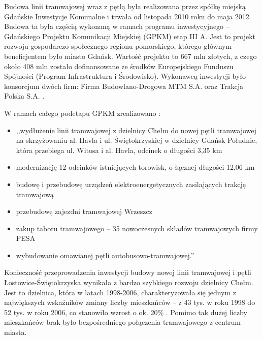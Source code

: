 \documentclass[twoside,12pt]{article}
\begin{document}
	Budowa linii tramwajowej wraz z pętlą była realizowana przez spółkę miejską Gdańskie Inwestycje Komunalne i trwała od listopada 2010 roku do maja 2012. Budowa ta była częścią wykonaną w ramach programu inwestycyjnego -- Gdańskiego Projektu Komunikacji Miejskiej (GPKM) etap III A. Jest to projekt rozwoju gospodarczo-społecznego regionu pomorskiego, którego głównym beneficjentem było miasto Gdańsk. Wartość projektu to 667 mln złotych, z czego około 408 mln zostało dofinansowane ze środków Europejskiego Funduszu Spójności (Program Infrastruktura i Środowisko). Wykonawcą inwestycji było konsorcjum dwóch firm: Firma Budowlano-Drogowa MTM S.A. oraz Trakcja Polska S.A. \cite{portal_gdansk}. 
	
	\begin{samepage}
	W ramach całego podetapu GPKM zrealizowano \cite{portal_gdansk}:
	\begin{itemize}\setlength{\itemsep}{0em}
	\item ,,wydłużenie linii tramwajowej z dzielnicy Chełm do nowej pętli tramwajowej na skrzyżowaniu al. Havla i ul. Świętokrzyskiej w dzielnicy Gdańsk Południe, która przebiega ul. Witosa i al. Havla, odcinek o długości 3,35 km
	\item modernizację 12 odcinków istniejących torowisk, o łącznej długości 12,06 km
	\item budowę i przebudowę urządzeń elektroenergetycznych zasilających trakcję tramwajową
	\item przebudowę zajezdni tramwajowej Wrzeszcz
	\item zakup taboru tramwajowego – 35 nowoczesnych składów tramwajowych firmy PESA
	\item wybudowanie omawianej pętli autobusowo-tramwajowej.'' \cite{portal_gdansk}
	\end{itemize}\end{samepage}
	
	Konieczność przeprowadzenia inwestycji budowy nowej linii tramwajowej i pętli Łostowice-Świętokrzyska wynikała z bardzo szybkiego rozwoju dzielnicy Chełm. Jest to dzielnica, która w latach 1998-2006, charakteryzowała się jednym z największych wskaźników zmiany liczby mieszkańców -- z 43 tys. w roku 1998 do 52 tys. w roku 2006, co stanowiło wzrost o ok. 20\% \cite{opracowanie_gdansk}. Pomimo tak dużej liczby mieszkańców brak było bezpośredniego połączenia tramwajowego z centrum miasta.
	
\end{document}
